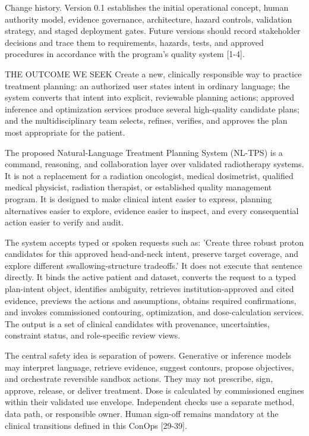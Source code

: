 \documentclass[11pt,letterpaper]{article}
\begin{document}
Change history. Version 0.1 establishes the initial operational concept, human authority model, evidence governance, architecture, hazard controls, validation strategy, and staged deployment gates. Future versions should record stakeholder decisions and trace them to requirements, hazards, tests, and approved procedures in accordance with the program's quality system [1-4].


\begin{nlnotice}{THE OUTCOME WE SEEK}
Create a new, clinically responsible way to practice treatment planning: an authorized user states intent in ordinary language; the system converts that intent into explicit, reviewable planning actions; approved inference and optimization services produce several high-quality candidate plans; and the multidisciplinary team selects, refines, verifies, and approves the plan most appropriate for the patient.
\end{nlnotice}

The proposed Natural-Language Treatment Planning System (NL-TPS) is a command, reasoning, and collaboration layer over validated radiotherapy systems. It is not a replacement for a radiation oncologist, medical dosimetrist, qualified medical physicist, radiation therapist, or established quality management program. It is designed to make clinical intent easier to express, planning alternatives easier to explore, evidence easier to inspect, and every consequential action easier to verify and audit.

The system accepts typed or spoken requests such as: 'Create three robust proton candidates for this approved head-and-neck intent, preserve target coverage, and explore different swallowing-structure tradeoffs.' It does not execute that sentence directly. It binds the active patient and dataset, converts the request to a typed plan-intent object, identifies ambiguity, retrieves institution-approved and cited evidence, previews the actions and assumptions, obtains required confirmations, and invokes commissioned contouring, optimization, and dose-calculation services. The output is a set of clinical candidates with provenance, uncertainties, constraint status, and role-specific review views.

The central safety idea is separation of powers. Generative or inference models may interpret language, retrieve evidence, suggest contours, propose objectives, and orchestrate reversible sandbox actions. They may not prescribe, sign, approve, release, or deliver treatment. Dose is calculated by commissioned engines within their validated use envelope. Independent checks use a separate method, data path, or responsible owner. Human sign-off remains mandatory at the clinical transitions defined in this ConOps [29-39].
\end{document}
